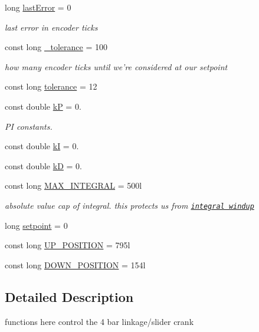 \begin{DoxyCompactItemize}
long \hyperlink{classArm_a5061b95381cc72d417f5a5275b871e47}{last\-Error} = 0
\begin{DoxyCompactList}\small\item\em last error in encoder ticks \end{DoxyCompactList}\item 
const long \hyperlink{classArm_af2251ac7ebd3c88f660e7a6dcc62ffd0}{\-\_\-tolerance} = 100
\begin{DoxyCompactList}\small\item\em how many encoder ticks until we're considered at our setpoint \end{DoxyCompactList}\item 
const long \hyperlink{classArm_afb4e56fd59b92d0b4c157c0ea7fe9db8}{tolerance} = 12
\item 
const double \hyperlink{classArm_ac6d95b0c5f8a7700b3d25a9fcead2291}{k\-P} = 0.
\begin{DoxyCompactList}\small\item\em P\-I constants. \end{DoxyCompactList}\item 
const double \hyperlink{classArm_a15dca8014bd3994a0d9b62efc0bcb983}{k\-I} = 0.
\item 
const double \hyperlink{classArm_aba816c407060b76429a785f6b15a6980}{k\-D} = 0.
\item 
const long \hyperlink{classArm_a05988f2c31e40dd3894c1343bf73a7b8}{M\-A\-X\-\_\-\-I\-N\-T\-E\-G\-R\-A\-L} = 500l
\begin{DoxyCompactList}\small\item\em absolute value cap of integral. this protects us from \href{https://en.wikipedia.org/wiki/Integral_windup}{\tt integral windup} \end{DoxyCompactList}\item 
long \hyperlink{classArm_aa168ca685ff8170699ca535590c2af14}{setpoint} = 0
\item 
const long \hyperlink{classArm_a44fed3661f22f9acd7f3cd8635a4fc6a}{U\-P\-\_\-\-P\-O\-S\-I\-T\-I\-O\-N} = 795l
\item 
const long \hyperlink{classArm_a3a95b43d43f1e4858829ff474555f81f}{D\-O\-W\-N\-\_\-\-P\-O\-S\-I\-T\-I\-O\-N} = 154l
\end{DoxyCompactItemize}


\subsection{Detailed Description}
functions here control the 4 bar linkage/slider crank 

